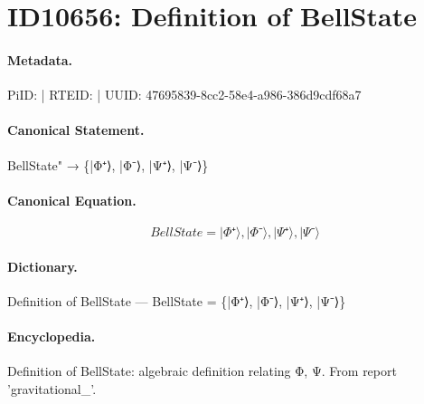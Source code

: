 \section*{ID10656: Definition of BellState}
\paragraph{Metadata.}
PiID:  | RTEID:  | UUID: 47695839-8cc2-58e4-a986-386d9cdf68a7

\paragraph{Canonical Statement.}
BellState" → \{|Φ⁺⟩, |Φ⁻⟩, |Ψ⁺⟩, |Ψ⁻⟩\}

\paragraph{Canonical Equation.}
\[
BellState = {|Φ⁺⟩, |Φ⁻⟩, |Ψ⁺⟩, |Ψ⁻⟩}
\]

\paragraph{Dictionary.}
Definition of BellState — BellState = \{|Φ⁺⟩, |Φ⁻⟩, |Ψ⁺⟩, |Ψ⁻⟩\}

\paragraph{Encyclopedia.}
Definition of BellState: algebraic definition relating Φ, Ψ. From report 'gravitational\_'.
